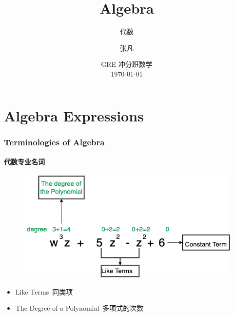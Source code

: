 \documentclass[
	11pt, %
	handout,
]{beamer}
\title[Algebra]{Algebra} %
\subtitle{代数} %
\author[张凡]{张凡} %
\institute[XDF]{新东方国际教育 \\ \smallskip \textit{zhangfan@xdf.cn}} %
\date[\today]{GRE 冲分班数学 \\ \today} %
\begin{document}

\begin{frame}
	\titlepage %
\end{frame}






\section{Algebra Expressions}


\begin{frame}
	\frametitle{Terminologies of Algebra}
	\framesubtitle{代数专业名词}
	
			\begin{figure}
				\includegraphics[width=0.8\linewidth]{Polynomial.png}
			\end{figure}
			\begin{itemize}
				\item Like Terms\ 同类项
				\item The Degree of a Polynomial\ 多项式的次数
			\end{itemize}
\end{frame}

\end{document}

